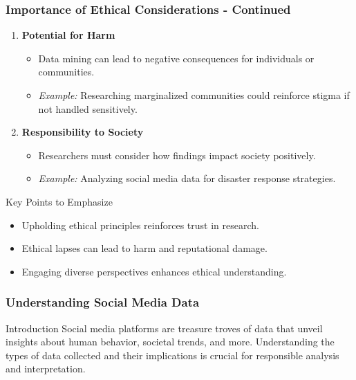 \documentclass{beamer}
\begin{document}
\begin{frame}[fragile]
    \frametitle{Importance of Ethical Considerations - Continued}
    \begin{enumerate}[resume]
        \item \textbf{Potential for Harm}
            \begin{itemize}
                \item Data mining can lead to negative consequences for individuals or communities.
                \item \textit{Example:} Researching marginalized communities could reinforce stigma if not handled sensitively.
            \end{itemize}

        \item \textbf{Responsibility to Society}
            \begin{itemize}
                \item Researchers must consider how findings impact society positively.
                \item \textit{Example:} Analyzing social media data for disaster response strategies.
            \end{itemize}
    \end{enumerate}
    
    \begin{block}{Key Points to Emphasize}
        \begin{itemize}
            \item Upholding ethical principles reinforces trust in research.
            \item Ethical lapses can lead to harm and reputational damage.
            \item Engaging diverse perspectives enhances ethical understanding.
        \end{itemize}
    \end{block}
\end{frame}

\begin{frame}[fragile]
    \frametitle{Understanding Social Media Data}
    \begin{block}{Introduction}
        Social media platforms are treasure troves of data that unveil insights about human behavior, societal trends, and more. Understanding the types of data collected and their implications is crucial for responsible analysis and interpretation.
    \end{block}
\end{frame}
\end{document}
